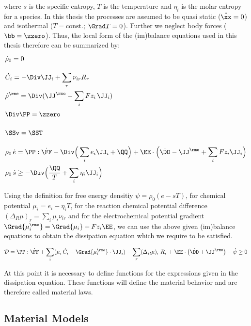 where $s$ is the specific entropy, $T$ is the temperature and $\eta_i$ is the molar entropy for a species. In this thesis the processes are assumed to be quasi static ($\ddot\xx=0$) and isothermal ($T=\text{const.}$; $\Grad T = 0$). Further we neglect body forces ($\bb=\zzero$). Thus, the local form of the (im)balance equations used in this thesis therefore can be summarized by:
\begin{align}
  \vphantom{\sum_i}& \dot\rho_0 = 0 \\
  \vphantom{\sum_i}& \dot C_i = -\Div\JJ_i + \sum_r \nu_{ir} R_r \\
  \vphantom{\sum_i}& \dot \rho^{\rme} = \Div(\JJ^\rme - \sum_i Fz_i\, \JJ_i) \\
  \vphantom{\sum_i}& \Div\PP = \zzero \\
  \vphantom{\sum_i}& \SSv = \SST \\
  \vphantom{\sum_i}& \rho_0\,\dot e = \PP:\dot\FF - \Div\Big(\sum_i e_i \JJ_i+ \QQ \Big)+ \EE\cdot\Big(\dot \DD-\JJ^\rme+\sum_i Fz_i\JJ_i\Big) \\
  \vphantom{\sum_i}& \rho_0\,\dot s \geq -\Div\Big(\frac{\QQ}{T}+\sum_i \eta_i \JJ_i \Big)
\end{align}

Using the definition for free energy densitiy $\psi=\rho_0(e-sT)$, for chemical potential $\mu_i=e_i-\eta_iT$, for the reaction chemical potential difference $(\Delta_R\mu)_r=\sum_i \mu_i\nu_{ir}$ and for the electrochemical potential gradient $\Grad{\mu^\rme_i}=\Grad{\mu_i} + Fz_i\EE$, we can use the above given (im)balance equations to obtain the dissipation equation which we require to be satisfied. 

\begin{align}
  \begin{aligned}
    \mathcal{D} = \PP:\dot\FF + \sum_i (\mu_i\,\dot C_i-\Grad{\mu_i^\rme}\cdot\JJ_i) - \sum_r (\Delta_R\mu)_r \,R_r + \EE\cdot\big(\dot\DD+\JJ^\rme\big)- \dot\psi\geq 0
  \end{aligned}
  \label{eq:dissipation}
\end{align}

At this point it is necessary to define functions for the expressions given in the dissipation equation. These functions will define the material behavior and are therefore called material laws. 

\subsection{Material Models}
